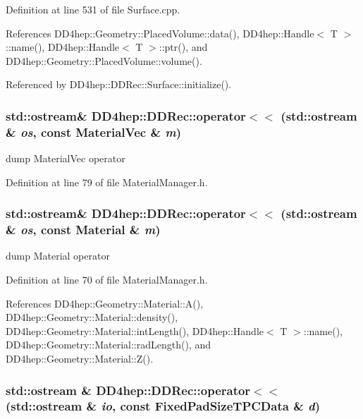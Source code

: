 Definition at line 531 of file Surface.cpp.

References DD4hep::Geometry::PlacedVolume::data(), DD4hep::Handle$<$ T $>$::name(), DD4hep::Handle$<$ T $>$::ptr(), and DD4hep::Geometry::PlacedVolume::volume().

Referenced by DD4hep::DDRec::Surface::initialize().\hypertarget{namespace_d_d4hep_1_1_d_d_rec_a8e4fdb5e46547f315ba9b683d2b9e0e7}{
\subsubsection[{operator$<$$<$}]{\setlength{\rightskip}{0pt plus 5cm}std::ostream\& DD4hep::DDRec::operator$<$$<$ (std::ostream \& {\em os}, \/  const MaterialVec \& {\em m})}}
\label{namespace_d_d4hep_1_1_d_d_rec_a8e4fdb5e46547f315ba9b683d2b9e0e7}


dump MaterialVec operator 

Definition at line 79 of file MaterialManager.h.\hypertarget{namespace_d_d4hep_1_1_d_d_rec_ae8f5d05fd4ac3fcd53bc8f469f9b4ec4}{
\subsubsection[{operator$<$$<$}]{\setlength{\rightskip}{0pt plus 5cm}std::ostream\& DD4hep::DDRec::operator$<$$<$ (std::ostream \& {\em os}, \/  const Material \& {\em m})}}
\label{namespace_d_d4hep_1_1_d_d_rec_ae8f5d05fd4ac3fcd53bc8f469f9b4ec4}


dump Material operator 

Definition at line 70 of file MaterialManager.h.

References DD4hep::Geometry::Material::A(), DD4hep::Geometry::Material::density(), DD4hep::Geometry::Material::intLength(), DD4hep::Handle$<$ T $>$::name(), DD4hep::Geometry::Material::radLength(), and DD4hep::Geometry::Material::Z().\hypertarget{namespace_d_d4hep_1_1_d_d_rec_aa514e41eeafbaef792fcf63b9f571f79}{
\subsubsection[{operator$<$$<$}]{\setlength{\rightskip}{0pt plus 5cm}std::ostream \& DD4hep::DDRec::operator$<$$<$ (std::ostream \& {\em io}, \/  const FixedPadSizeTPCData \& {\em d})}}
\label{namespace_d_d4hep_1_1_d_d_rec_aa514e41eeafbaef792fcf63b9f571f79}


